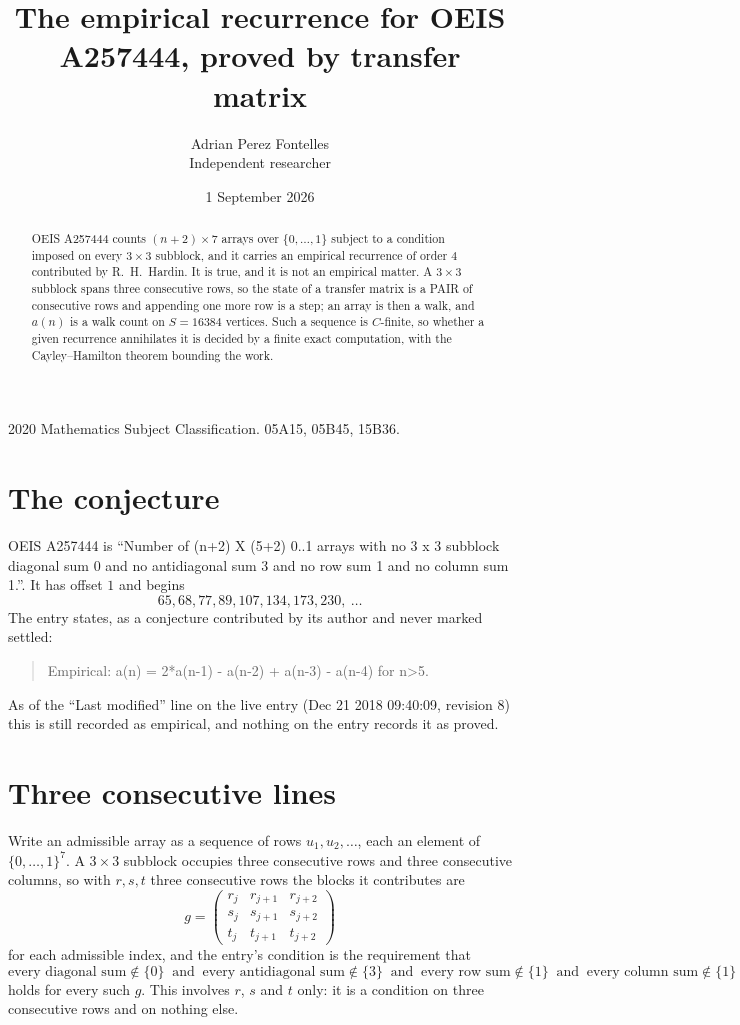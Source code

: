 \documentclass[11pt,a4paper]{article}
\title{The empirical recurrence for OEIS A257444, proved by transfer matrix}
\author{Adrian Perez Fontelles\\ \small Independent researcher}
\date{1 September 2026}
\theoremstyle{plain}
\theoremstyle{definition}
\begin{document}
\maketitle

\begin{abstract}
OEIS A257444 counts $(n+2)\times7$ arrays over $\{0,\dots,1\}$ subject to a condition imposed on
every $3\times3$ subblock, and it carries an empirical recurrence of order $4$
contributed by R.~H.~Hardin. It is true, and it is not an empirical matter. A $3\times3$
subblock spans three consecutive rows, so the state of a transfer matrix is a PAIR of
consecutive rows and appending one more row is a step; an array is then a walk, and
$a(n)$ is a walk count on $S=16384$ vertices. Such a sequence is $C$-finite, so whether a given
recurrence annihilates it is decided by a finite exact computation, with the Cayley--Hamilton
theorem bounding the work.
\end{abstract}

\noindent\small 2020 Mathematics Subject Classification. 05A15, 05B45, 15B36.\normalsize

\section{The conjecture}

OEIS A257444 is ``Number of (n+2) X (5+2) 0..1 arrays with no 3 x 3 subblock diagonal sum 0 and no antidiagonal sum 3 and no row sum 1 and no column sum 1.''. It has offset $1$ and begins
\[
65, 68, 77, 89, 107, 134, 173, 230,\ \dots
\]
The entry states, as a conjecture contributed by its author and never marked settled:
\begin{quote}
Empirical: a(n) = 2*a(n-1) - a(n-2) + a(n-3) - a(n-4) for n>5.
\end{quote}
As of the ``Last modified'' line on the live entry (Dec 21 2018 09:40:09, revision 8) this is still
recorded as empirical, and nothing on the entry records it as proved.

\section{Three consecutive lines}

Write an admissible array as a sequence of rows $u_1,u_2,\dots$, each an element of
$\{0,\dots,1\}^{7}$. A $3\times3$ subblock occupies three consecutive rows and
three consecutive columns, so with $r,s,t$ three consecutive rows the blocks it
contributes are
\[
g=\begin{pmatrix}r_j&r_{j+1}&r_{j+2}\\ s_j&s_{j+1}&s_{j+2}\\ t_j&t_{j+1}&t_{j+2}\end{pmatrix}
\]
for each admissible index, and the entry's condition is the requirement that
\[
\text{every diagonal sum} \notin \{0\}\ \text{ and }\ \text{every antidiagonal sum} \notin \{3\}\ \text{ and }\ \text{every row sum} \notin \{1\}\ \text{ and }\ \text{every column sum} \notin \{1\}
\]
holds for every such $g$. This involves $r$, $s$ and $t$ only: it is a condition on
three consecutive rows and on nothing else.
\end{document}
